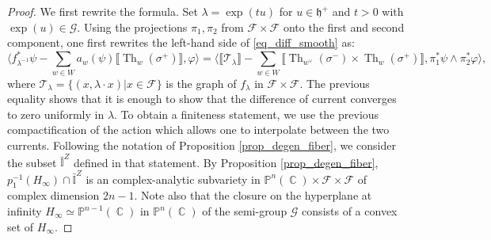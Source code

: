 \documentclass[12pt]{amsbook}%
\theoremstyle{definition}
\theoremstyle{remark}
\numberwithin{section}{chapter}
\numberwithin{subsection}{section}
\numberwithin{figure}{chapter}
\DeclareMathOperator{\C}{\mathbb{C}}
\DeclareMathOperator{\Th}{Th}
\newcommand\intcur[1]{\llbracket #1 \rrbracket}
\def\bP{{\mathbb{P}}}
\def\cF{{\mathscr{F}}}
\begin{document}
{{\begin{proof}
We first rewrite the formula.
Set $\lambda = \exp(t u)$ for $u \in \mathfrak{h}^+$ and $t > 0$ with $\exp(u) \in \mathcal{G}$. 
Using the projections $\pi_1,\pi_2$ from $\cF \times \cF$ onto the first and second component, one first rewrites the left-hand side of \eqref{eq_diff_smooth} as: 
\begin{equation} \label{eq_difference_graphs}
\langle f_{\lambda^{-1}}^* \psi - \sum_{w\in W} a_w(\psi)\intcur{\Th_w(\sigma^+)} , \varphi \rangle = \langle \intcur{\mathcal{T}_\lambda}  - \sum_{w\in W}  \intcur{ \Th_{w^\vee}(\sigma^-) \times \Th_w(\sigma^+)} , \pi_1^* \psi \wedge \pi_2^* \varphi  \rangle ,
\end{equation}
where $\mathcal{T}_\lambda = \{(x, \lambda \cdot x) | x\in \cF  \}$ is the graph of $f_\lambda$ in $\cF\times \cF$. 
The previous equality shows that it is enough to show that the difference of current converges to zero uniformly in $\lambda$. 
To obtain a finiteness statement, we use the previous compactification of the action which allows one to interpolate between the two currents. 
Following the notation of Proposition \ref{prop_degen_fiber}, we consider the subset $ \bar{\mathbb{I}}^Z$ defined in that statement.
By Proposition \ref{prop_degen_fiber},  $p_1^{-1}(H_\infty) \cap \bar{\mathbb{I}}^Z$ is an complex-analytic subvariety in $\bP^n(\C)\times \cF \times \cF$ of complex dimension  $2n-1$. 
 Note also that the closure on the hyperplane at infinity $H_\infty \simeq \bP^{n-1}(\C)$ in $\bP^n(\C)$ of the semi-group $\mathcal{G}$ consists of   a convex set of $H_\infty$.  


\end{proof}}}
\end{document}
